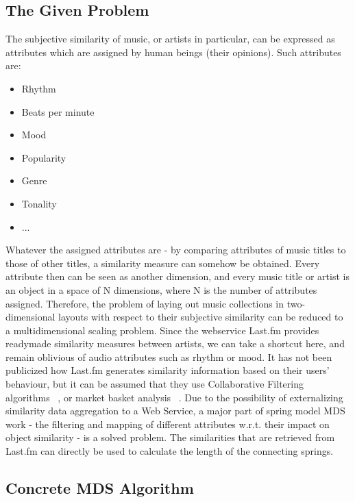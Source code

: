 \subsection{The Given Problem}

The subjective similarity of music, or artists in particular, can be expressed as attributes which are assigned by human beings (their opinions). Such attributes are:

\begin{itemize}
	\item Rhythm
	\item Beats per minute
	\item Mood
	\item Popularity
	\item Genre
	\item Tonality
	\item ...
\end{itemize}

Whatever the assigned attributes are - by comparing attributes of music titles to those of other titles, a similarity measure can somehow be obtained. Every attribute then can be seen as another dimension, and every music title or artist is an object in a space of N dimensions, where N is the number of attributes assigned. Therefore, the problem of laying out music collections in two-dimensional layouts with respect to their subjective similarity can be reduced to a multidimensional scaling problem.
Since the webservice Last.fm provides readymade similarity measures between artists, we can take a shortcut here, and remain oblivious of audio attributes such as rhythm or mood. It has not been publicized how Last.fm generates similarity information based on their users' behaviour, but it can be assumed that they use Collaborative Filtering algorithms ~\cite{Takacs:2007}, or market basket analysis ~\cite{Aggarwal99anew}. Due to the possibility of externalizing similarity data aggregation to a Web Service, a major part of spring model MDS work - the filtering and mapping of different attributes w.r.t. their impact on object similarity - is a solved problem. The similarities that are retrieved from Last.fm can directly be used to calculate the length of the connecting springs.

\subsection{Concrete MDS Algorithm}

